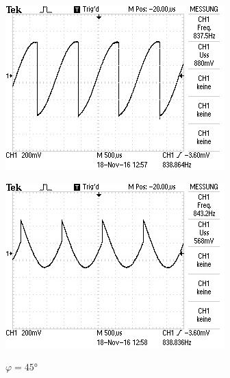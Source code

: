 \begin{figure}[!h]
\begin{minipage}[t]{0.3\textwidth}
\includegraphics[width=\textwidth]{Bilder/Rausch0.jpg}
\label{fig:}
\caption*{$\varphi = 0\si{\degree}$}
\end{minipage}
\hspace{10pt}
\vspace{5pt}
\begin{minipage}[t]{0.3\textwidth}
\includegraphics[width=\textwidth]{Bilder/Rausch120.jpg}
\label{fig:8}
\caption*{$\varphi = 45\si{\degree}$}
\end{minipage}
\hspace{10pt}
\vspace{5pt}

\end{figure}
